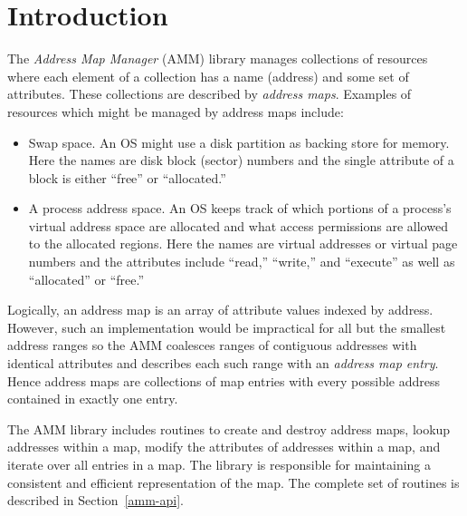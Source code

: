 %
% 
%
\label{amm}

\section{Introduction}

The \emph{Address Map Manager} (AMM) library manages collections of resources
where each element of a collection has a name (address) and some set of
attributes.
These collections are described by \emph{address maps}.
Examples of resources which might be managed by address maps include:

\begin{itemize}
\item	Swap space.
	An OS might use a disk partition as backing store for memory.
	Here the names are disk block (sector) numbers and the single
	attribute of a block is either ``free'' or ``allocated.''

\item	A process address space.
	An OS keeps track of which portions of a process's virtual
	address space are allocated and what access permissions are allowed
	to the allocated regions.
	Here the names are virtual addresses or virtual page numbers and
	the attributes include ``read,'' ``write,'' and ``execute'' as well
	as ``allocated'' or ``free.''
\end{itemize}

Logically, an address map is an array of attribute values indexed by address.
However, such an implementation would be impractical for all but the smallest
address ranges so the AMM coalesces ranges of contiguous addresses with
identical attributes and describes each such range with an
\emph{address map entry}.
Hence address maps are collections of map entries with every possible
address contained in exactly one entry.

The AMM library includes routines to create and destroy address maps,
lookup addresses within a map,
modify the attributes of addresses within a map,
and iterate over all entries in a map.
The library is responsible for maintaining a consistent and efficient
representation of the map.
The complete set of routines is described in Section~\ref{amm-api}.

